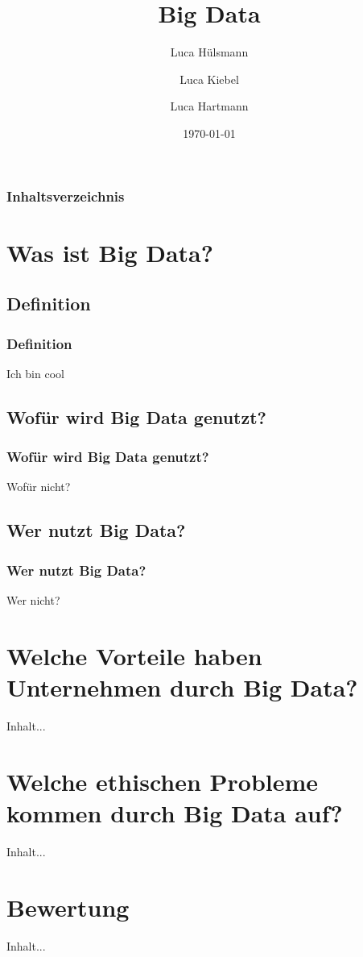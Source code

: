 \documentclass[10pt,a4paper]{beamer}
\author{Luca Hülsmann \and Luca Kiebel \and Luca Hartmann}
\title{Big Data}
\date{\today}
\begin{document}
\begin{frame}
\titlepage
\end{frame}

\begin{frame}
\frametitle{Inhaltsverzeichnis}\tableofcontents
\end{frame}

\section{Was ist Big Data?}

\subsection{Definition}
\begin{frame}
\frametitle{Definition}
Ich bin cool
\end{frame}

\subsection{Wofür wird Big Data genutzt?}
\begin{frame}
\frametitle{Wofür wird Big Data genutzt?}
Wofür nicht?
\end{frame}

\subsection{Wer nutzt Big Data?}
\begin{frame}
\frametitle{Wer nutzt Big Data?}
Wer nicht?
\end{frame}

\section{Welche Vorteile haben Unternehmen durch Big Data?}
\begin{frame}
Inhalt...
\end{frame}

\section{Welche ethischen Probleme kommen durch Big Data auf?}
\begin{frame}
Inhalt...
\end{frame}

\section{Bewertung}
\begin{frame}
Inhalt...
\end{frame}
\end{document}

